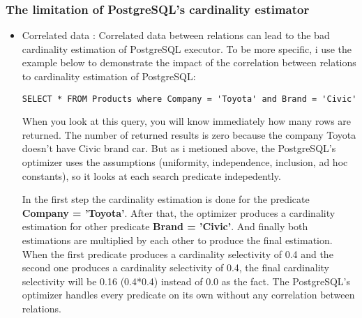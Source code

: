 \subsubsection{The limitation of PostgreSQL's cardinality estimator}
{\justify
\begin{itemize}
\item Correlated data : Correlated data \cite{CE limitations} between relations can lead to the bad cardinality estimation of PostgreSQL executor. To be more specific, i use the example below to demonstrate the impact of the correlation between relations to cardinality estimation of PostgreSQL:
\begin{verbatim}
SELECT * FROM Products where Company = 'Toyota' and Brand = 'Civic'
\end{verbatim}
When you look at this query, you will know immediately how many rows are returned. The number of returned results is zero because the company Toyota doesn't have Civic brand car. But as i metioned above, the PostgreSQL's optimizer uses the assumptions (uniformity, independence, inclusion, ad hoc constants), so it looks at each search predicate indepedently. \par 
In the first step the cardinality estimation is done for the predicate {\bfseries Company = 'Toyota'}. After that, the optimizer produces a cardinality estimation for other predicate {\bfseries Brand = 'Civic'}. And finally both estimations are multiplied by each other to produce the final estimation. When the first predicate produces a cardinality selectivity of 0.4 and the second one produces a cardinality selectivity of 0.4, the final cardinality selectivity will be 0.16 (0.4*0.4) instead of 0.0 as the fact. The PostgreSQL's optimizer handles every predicate on its own without any correlation between relations.
\end{itemize}
}